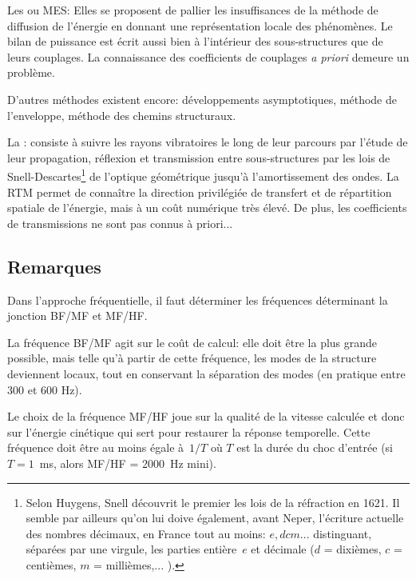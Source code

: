 \bigskip
Les  ou MES: Elles se proposent de pallier les insuffisances de la méthode de diffusion de l'énergie en donnant une représentation locale des phénomènes. Le bilan de puissance est écrit aussi bien à l'intérieur des sous-structures que de leurs couplages. La connaissance des coefficients de couplages \emph{a priori} demeure un problème.

\bigskip
D'autres méthodes existent encore: développements asymptotiques, méthode de l'enveloppe, méthode des chemins structuraux.

La : consiste à suivre les rayons vibratoires le long de leur parcours par l'étude de leur propagation, réflexion et transmission entre sous-structures par les lois de Snell-Descartes\footnote{Selon Huygens, Snell découvrit le premier les lois de la réfraction en 1621. Il semble par ailleurs qu'on lui doive également, avant Neper, l'écriture actuelle des nombres décimaux, en France tout au moins: $e,dcm...$ distinguant, séparées par une virgule, les parties entière~$e$ et décimale ($d$ = dixièmes, $c$ = centièmes, $m$ = millièmes,... ).} de l'optique géométrique jusqu'à l'amortissement des ondes. La RTM permet de connaître la direction privilégiée de transfert et de répartition spatiale de l'énergie, mais à un coût numérique très élevé. De plus, les coefficients de transmissions ne sont pas connus à priori...

\medskip
\subsection{Remarques}

Dans l'approche fréquentielle, il faut déterminer les fréquences déterminant la jonction BF/MF et MF/HF.

La fréquence BF/MF agit sur le coût de calcul: elle doit être la plus grande possible, mais telle qu'à partir de cette fréquence, les modes de la structure deviennent locaux, tout en conservant la séparation des modes (en pratique entre 300 et 600 Hz).

Le choix de la fréquence MF/HF joue sur la qualité de la vitesse calculée et donc sur l'énergie cinétique qui sert pour restaurer la réponse temporelle. Cette fréquence doit être au moins égale à~$1/T$ où $T$ est la durée du choc d'entrée (si~$T=1$~ms, alors MF/HF = 2000~Hz mini).

